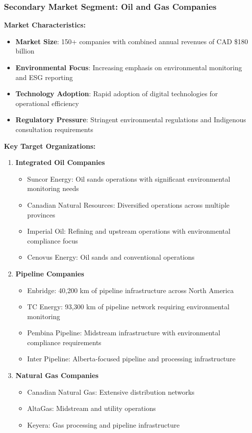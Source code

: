 \subsubsection{Secondary Market Segment: Oil and Gas Companies}

\textbf{Market Characteristics:}
\begin{itemize}
    \item \textbf{Market Size}: 150+ companies with combined annual revenues of CAD \$180 billion
    \item \textbf{Environmental Focus}: Increasing emphasis on environmental monitoring and ESG reporting
    \item \textbf{Technology Adoption}: Rapid adoption of digital technologies for operational efficiency
    \item \textbf{Regulatory Pressure}: Stringent environmental regulations and Indigenous consultation requirements
\end{itemize}

\textbf{Key Target Organizations:}
\begin{enumerate}
    \item \textbf{Integrated Oil Companies}
    \begin{itemize}
        \item Suncor Energy: Oil sands operations with significant environmental monitoring needs
        \item Canadian Natural Resources: Diversified operations across multiple provinces
        \item Imperial Oil: Refining and upstream operations with environmental compliance focus
        \item Cenovus Energy: Oil sands and conventional operations
    \end{itemize}
    
    \item \textbf{Pipeline Companies}
    \begin{itemize}
        \item Enbridge: 40,200 km of pipeline infrastructure across North America
        \item TC Energy: 93,300 km of pipeline network requiring environmental monitoring
        \item Pembina Pipeline: Midstream infrastructure with environmental compliance requirements
        \item Inter Pipeline: Alberta-focused pipeline and processing infrastructure
    \end{itemize}
    
    \item \textbf{Natural Gas Companies}
    \begin{itemize}
        \item Canadian Natural Gas: Extensive distribution networks
        \item AltaGas: Midstream and utility operations
        \item Keyera: Gas processing and pipeline infrastructure
    \end{itemize}
\end{enumerate}


